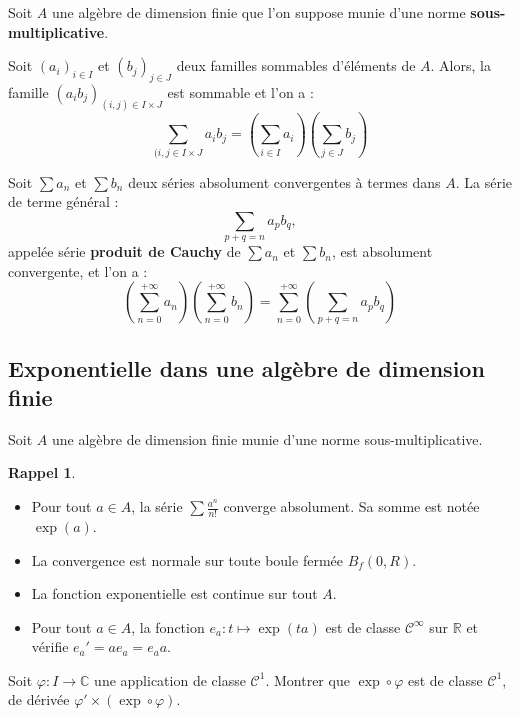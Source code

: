 \documentclass[french]{article}
\newcommand{\R}{\mathbb{R}}
\newcommand{\C}{\mathbb{C}}
\theoremstyle{plain}
\theoremstyle{definition}
\newtheorem*{rappel}{Rappel}
\theoremstyle{remark}
\begin{document}
Soit $A$ une algèbre de dimension finie que l'on suppose munie d'une norme \textbf{sous-multiplicative}.

\begin{lem}%
	Soit $(a_i)_{i\in I}$ et $(b_j)_{j\in J}$ deux familles sommables d'éléments de $A$. Alors, la famille $(a_ib_j)_{(i,j)\in I\times J}$ est sommable et l'on a : $$\sum_{(i,j\in I\times J}a_ib_j=\left(\sum_{i\in I}a_i\right)\left(\sum_{j\in J}b_j\right)$$
\end{lem}

\begin{thm}
	Soit $\displaystyle\sum a_n$ et $\displaystyle\sum b_n$ deux séries absolument convergentes à termes dans $A$. La série de terme général : $$\sum_{p+q=n}a_pb_q,$$ appelée série \textbf{produit de Cauchy} de $\displaystyle\sum a_n$ et $\displaystyle\sum b_n$, est absolument convergente, et l'on a : $$\left(\sum_{n=0}^{+\infty}a_n\right)\left(\sum_{n=0}^{+\infty}b_n\right)=\sum_{n=0}^{+\infty}\left(\sum_{p+q=n}a_pb_q\right)$$
\end{thm}

\subsection{Exponentielle dans une algèbre de dimension finie}

Soit $A$ une algèbre de dimension finie munie d'une norme sous-multiplicative.

\begin{rappel}
	\begin{itemize}
	\item Pour tout $a\in A$, la série $\displaystyle\sum\frac{a^n}{n!}$ converge absolument. Sa somme est notée $\exp(a)$.
	\item La convergence est normale sur toute boule fermée $B_f(0,R)$.
	\item La fonction exponentielle est continue sur tout $A$.
	\item Pour tout $a\in A$, la fonction $e_a:t\mapsto\exp(ta)$ est de classe $\mathcal{C}^\infty$ sur $\R$ et vérifie $e_a'=ae_a=e_aa$.
\end{itemize}
\end{rappel}

\begin{exo}
	Soit $\varphi:I\to\C$ une application de classe $\mathcal{C}^1$. Montrer que $\exp\circ \varphi$ est de classe $\mathcal{C}^1$, de dérivée $\varphi'\times(\exp\circ\varphi)$.
\end{exo}
\end{document}

